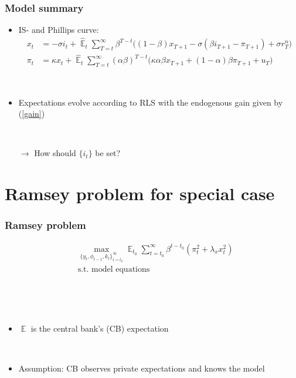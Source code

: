 \documentclass{beamer}
\DeclareMathOperator{\E}{\mathbb{E}}
\begin{document}
\begin{frame}
	\frametitle{Model summary}
	\label{aggregate_LOMS}
\begin{itemize}
\item IS- and Phillips curve:	
 \begin{align}
x_t &=  -\sigma i_t +\hat{\E}_t \sum_{T=t}^{\infty} \beta^{T-t }\big( (1-\beta)x_{T+1} - \sigma(\beta i_{T+1} - \pi_{T+1}) +\sigma r_T^n \big)  \label{NKIS}  \\
\pi_t &= \kappa x_t +\hat{\E}_t \sum_{T=t}^{\infty} (\alpha\beta)^{T-t }\big( \kappa \alpha \beta x_{T+1} + (1-\alpha)\beta \pi_{T+1} + u_T\big) \label{NKPC} 
\end{align}
\hfill \hyperlink{derivations}{}

\

\item  Expectations evolve according to RLS with the endogenous gain given by (\ref{gain})

\

\item[$\rightarrow$] How should $\{ i_t \}$ be set?
\end{itemize}



\end{frame}


\section{Ramsey problem for special case}

\begin{frame}
	\frametitle{Ramsey problem}
	
	 \begin{align*}
& \max_{ \{y_t, \phi_{t-1}, k_t \}_{t=t_0}^{\infty}} \E_{t_0}\sum_{t=t_0}^{\infty} \beta^{t-t_0} (\pi_t^2  + \lambda_x x_t^2 )  \\
& \text{s.t. model equations}
\end{align*}

\

\

\begin{itemize}
\item $\E$ is the central bank's (CB) expectation

\

\item Assumption: CB observes private expectations and knows the model
\end{itemize}

 

\end{frame}
\end{document}
